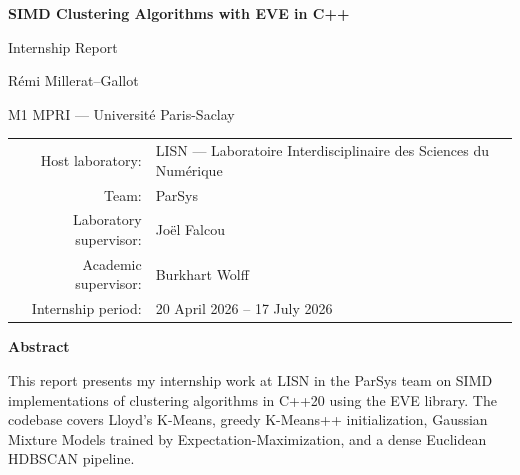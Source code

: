 \documentclass[11pt,a4paper]{article}
\begin{document}
\begin{titlepage}
  \centering

  \vspace*{1.2cm}

  {\Huge\bfseries SIMD Clustering Algorithms with EVE in C++\par}

  \vspace{0.6cm}

  {\Large Internship Report\par}

  \vspace{1.2cm}

  {\large Rémi Millerat--Gallot\par}

  \vspace{0.4cm}

  {\large M1 MPRI --- Université Paris-Saclay\par}

  \vspace{1.2cm}

  \begin{tabular}{@{}r p{}@{}}
    Host laboratory: & LISN --- Laboratoire Interdisciplinaire des Sciences du Numérique \\
    Team: & ParSys \\
    Laboratory supervisor: & Joël Falcou \\
    Academic supervisor: & Burkhart Wolff \\
    Internship period: & 20 April 2026 -- 17 July 2026 \\
  \end{tabular}

  \vspace{1.4cm}

  {\Large\bfseries Abstract\par}

    \vspace{0.4cm}
    
    \begin{minipage}{0.92\textwidth}
      \setlength{\parindent}{0pt}
      \setlength{\parskip}{0.65em}
    
      This report presents my internship work at LISN in the ParSys team on SIMD implementations of clustering algorithms in C++20 using the EVE library. The codebase covers Lloyd's K-Means, greedy K-Means++ initialization, Gaussian Mixture Models trained by Expectation-Maximization, and a dense Euclidean HDBSCAN pipeline.
    

\end{minipage}
\end{titlepage}
\end{document}
